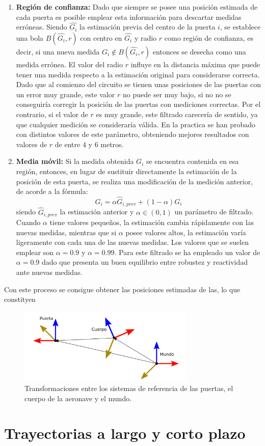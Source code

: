 \begin{enumerate}
	\item \textbf{Región de confianza:} Dado que siempre se posee una posición estimada de cada puerta es posible emplear esta información para descartar medidas erróneas. Siendo $\hat{G_i}$ la estimación previa del centro de la puerta $i$, se establece una bola $B(\hat{G_i},r)$ con centro en $\hat{G_i}$  y radio $r$ como región de confianza, es decir, si una nueva medida $G_i \notin B(\hat{G_i},r)$ entonces se desecha como una medida errónea.
	El valor del radio $r$ influye en la distancia máxima que puede tener una medida respecto a la estimación original para considerarse correcta. Dado que al comienzo del circuito se tienen unas posiciones de las puertas con un error muy grande, este valor $r$ no puede ser muy bajo, si no no se conseguiría corregir la posición de las puertas con mediciones correctas. Por el contrario, si el valor de $r$ es muy grande, este filtrado carecería de sentido, ya que cualquier medición se consideraría válida. En la practica se han probado con distintos valores de este parámetro, obteniendo mejores resultados con valores de $r$ de entre 4 y 6 metros.
	\item \textbf{Media móvil:} Si la medida obtenida $G_i$ se encuentra contenida en esa región, entonces, en lugar de sustituir directamente la estimación de la posición de esta puerta, se realiza una modificación de la medición anterior, de acorde a la fórmula:
	\begin{equation}
		\hat{G_i} = \alpha \hat{G}_{i,prev} + (1-\alpha)G_i
	\end{equation}
	siendo $\hat{G}_{i,prev}$ la estimación anterior y $\alpha \in (0,1)$ un parámetro de filtrado. Cuando $\alpha$ tiene valores pequeños, la estimación cambia rápidamente con las nuevas medidas, mientras que si $\alpha$ posee valores altos, la estimación varía ligeramente con cada una de las nuevas medidas. Los valores que se suelen emplear son $\alpha = 0.9$ y $\alpha = 0.99$. Para este filtrado se ha empleado un valor de $\alpha = 0.9$ dado que presenta un buen equilibrio entre robustez y reactividad ante nuevas medidas.

\end{enumerate}

Con este proceso se consigue obtener las posiciones estimadas de las, lo que constityen 

\begin{figure}[htb!]
	\centering
	\includegraphics[width=0.75\textwidth]{imagenes/frames}
	\caption{Transformaciones entre los sistemas de referencia de las puertas, el cuerpo de la aeronave y el mundo.}
	\label{waypoints:Refs}
\end{figure}







\section{Trayectorias a largo y corto plazo}

